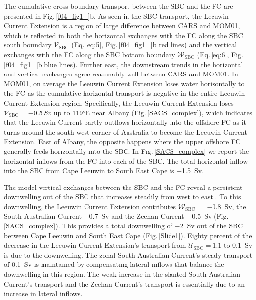 \documentclass[preprint,3p,review,12pt]{elsarticle}
\newcommand{\sub}[1]{_{\text{#1}}}
\begin{document}
The cumulative cross-boundary transport between the SBC and the FC are presented in Fig.\,\ref{f04_fig1_}b. As seen in the SBC transport, the Leeuwin Current Extension is a region of large difference
between CARS and MOM01,
which is reflected in both the horizontal exchanges with the FC along the SBC south boundary $\mathcal{V}\sub{SBC}$ (Eq.\,\ref{eq:5}, Fig.\,\ref{f04_fig1_}b red lines) and the vertical exchanges with the FC along the SBC bottom boundary $\mathcal{W}\sub{SBC}$ (Eq.\,\ref{eq:6}, Fig.\,\ref{f04_fig1_}b blue lines).
Further east, the downstream trends in the horizontal and vertical exchanges agree reasonably well between CARS and MOM01.
In MOM01, on average the Leeuwin Current Extension loses water horizontally to the FC as the cumulative horizontal transport is negative in the entire Leeuwin Current Extension region. Specifically, the Leeuwin Current Extension loses $\mathcal{V}\sub{SBC} = \SI{-0.5}{Sv}$ up to \ang{119}E near Albany (Fig.\,\ref{SACS_complex}), which indicates
that the Leeuwin Current partly outflows horizontally into the offshore FC as it turns around the south-west corner of Australia to become the Leeuwin Current Extension\@. East of Albany, the opposite happens where the upper offshore FC generally feeds horizontally into the SBC\@. In Fig.\,\ref{SACS_complex} we report the horizontal inflows from the FC into each of the SBC. The total horizontal inflow into the SBC from Cape Leeuwin to South East Cape is +\SI{1.5}{Sv}.

The model vertical exchanges between the SBC and the FC reveal a persistent downwelling out of the SBC that increases steadily from west to east \@. To this downwelling, the Leeuwin Current Extension contributes $\mathcal{W}\sub{SBC} =$ \SI{-0.8}{Sv}, the South Australian Current \SI{-0.7}{Sv} and the Zeehan Current \SI{-0.5}{Sv} (Fig.\,\ref{SACS_complex}). This provides a total downwelling of \SI{-2}{Sv} out of the SBC between Cape Leeuwin and South East Cape (Fig.\,\ref{Slide1}).
Eighty percent of the decrease in the Leeuwin Current Extension's transport from
$\mathcal{U}\sub{SBC} = \num{1.1}$ to \SI{0.1}{Sv} is
due to the downwelling.
The zonal South Australian Current's steady transport of \SI{0.1}{Sv} is maintained by compensating lateral inflows that balance the downwelling in this region. The weak increase
in the slanted South Australian Current's transport and the Zeehan Current's transport is essentially due to an increase in lateral inflows.
\end{document}
